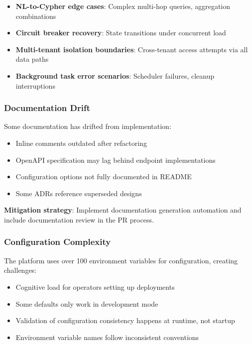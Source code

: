 \begin{itemize}
    \item \textbf{NL-to-Cypher edge cases}: Complex multi-hop queries, aggregation combinations
    \item \textbf{Circuit breaker recovery}: State transitions under concurrent load
    \item \textbf{Multi-tenant isolation boundaries}: Cross-tenant access attempts via all data paths
    \item \textbf{Background task error scenarios}: Scheduler failures, cleanup interruptions
\end{itemize}

\subsubsection{Documentation Drift}

Some documentation has drifted from implementation:

\begin{itemize}
    \item Inline comments outdated after refactoring
    \item OpenAPI specification may lag behind endpoint implementations
    \item Configuration options not fully documented in README
    \item Some ADRs reference superseded designs
\end{itemize}

\textbf{Mitigation strategy}: Implement documentation generation automation and include documentation review in the PR process.

\subsubsection{Configuration Complexity}

The platform uses over 100 environment variables for configuration, creating challenges:

\begin{itemize}
    \item Cognitive load for operators setting up deployments
    \item Some defaults only work in development mode
    \item Validation of configuration consistency happens at runtime, not startup
    \item Environment variable names follow inconsistent conventions
\end{itemize}

